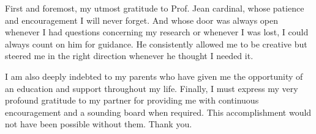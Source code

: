 \documentclass[
    english, %
    onehalfspacing, %
    headsepline, %
    parskip, %
]{MastersDoctoralThesis} %
\theoremstyle{definition}
\theoremstyle{remark}
\theoremstyle{plain}
\numberwithin{theorem}{section}
\begin{document}
    \begin{acknowledgements}
        \addchaptertocentry{\acknowledgementname} %
        First and foremost, my utmost gratitude to Prof. Jean cardinal, whose patience and encouragement I will never forget.
        And whose door was always open whenever I had questions concerning my research or whenever I was lost, I could always
        count on him for guidance. He consistently allowed me to be creative but steered me in the right direction whenever
        he thought I needed it.

        I am also deeply indebted to my parents who have given me the opportunity of an education and support throughout my life.
        Finally, I must express my very profound gratitude to my partner for providing me with continuous encouragement
        and a sounding board when required. This accomplishment would not have been possible without them. Thank you.

    \end{acknowledgements}

    \hypersetup{linkcolor=black}
    \tableofcontents %




\end{document}
